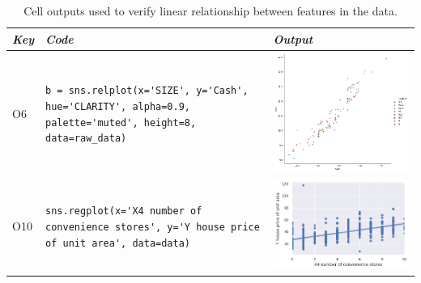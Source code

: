 \begin{table}
  \centering
  \caption{Cell outputs used to verify linear relationship between features in the data.}
  \begin{tabular}{@{}m{} m{} m{}@{}}
    \toprule
    \emph{\textbf{Key}}&
    \emph{\textbf{Code}}&
    \emph{\textbf{Output}}\\
    \midrule

    O6&
    \lstinline[]$b = sns.relplot(x='SIZE', y='Cash', hue='CLARITY', alpha=0.9, palette='muted', height=8, data=raw_data)$&
    \includegraphics[width=\linewidth]{linear-relation-check-lineplot.png}\\

    O10&
    \lstinline[]$sns.regplot(x='X4 number of convenience stores', y='Y house price of unit area', data=data)$&
    \includegraphics[width=\linewidth]{linear-relation-check-regplot.png}\\
    \bottomrule
  \end{tabular}
\label{tab:linear-relation-check}
\end{table}

